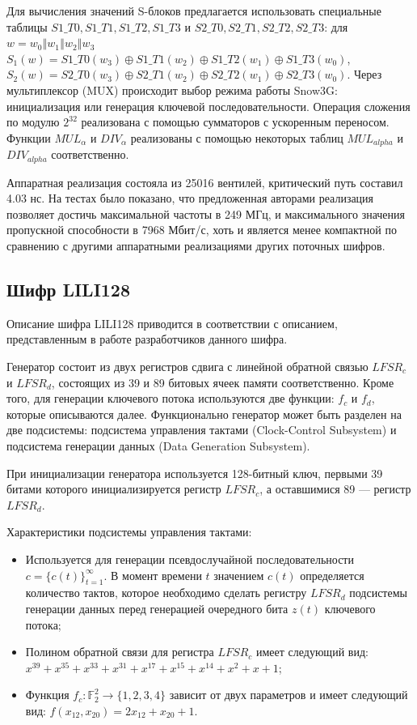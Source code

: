 \documentclass{./civarticle}
\begin{document}
Для вычисления значений S-блоков предлагается использовать специальные таблицы $S1\_T0, S1\_T1, S1\_T2, S1\_T3$ и $S2\_T0, S2\_T1, S2\_T2, S2\_T3$: для $w = w_0 \mathbin\Vert w_1 \mathbin\Vert w_2 \mathbin\Vert w_3$ $S_1(w) = S1\_T0(w_3)\oplus S1\_T1(w_2) \oplus S1\_T2(w_1) \oplus S1\_T3(w_0)$, $S_2(w) = S2\_T0(w_3) \oplus S2\_T1(w_2) \oplus S2\_T2(w_1) \oplus S2\_T3(w_0)$. Через мультиплексор (MUX) происходит выбор режима работы Snow3G: инициализация или генерация ключевой последовательности. Операция сложения по модулю $2^{32}$ реализована с помощью сумматоров с ускоренным переносом. Функции $MUL_\alpha$ и $DIV_\alpha$ реализованы с помощью некоторых таблиц $MUL_{alpha}$ и $DIV_{alpha}$ соответственно. 

Аппаратная реализация состояла из 25016 вентилей, критический путь составил 4.03 нс. На тестах было показано, что предложенная авторами реализация позволяет достичь максимальной частоты в 249 МГц, и максимального значения пропускной способности в 7968 Мбит/с, хоть и является менее компактной по сравнению с другими аппаратными реализациями других поточных шифров.

\subsection{Шифр LILI128}

Описание шифра LILI128 приводится в соответствии с описанием, представленным в работе \cite{lili} разработчиков данного шифра.

Генератор состоит из двух регистров сдвига с линейной обратной связью $LFSR_c$ и $LFSR_d$, состоящих из 39 и 89 битовых ячеек памяти соответственно. Кроме того, для генерации ключевого потока используются две функции: $f_c$ и $f_d$, которые описываются далее. Функционально генератор может быть разделен на две подсистемы: подсистема управления тактами (Clock-Control Subsystem) и подсистема генерации данных (Data Generation Subsystem).

При инициализации генератора используется 128-битный ключ, первыми 39 битами которого инициализируется регистр $LFSR_c$, а оставшимися 89 --- регистр $LFSR_d$.


Характеристики подсистемы управления тактами:
\begin{itemize}
    \item Используется для генерации псевдослучайной последовательности $c = \{c(t)\}_{t = 1}^{\infty}$. В момент времени $t$ значением $c(t)$ определяется количество тактов, которое необходимо сделать регистру $LFSR_d$ подсистемы генерации данных перед генерацией очередного бита $z(t)$ ключевого потока;
    \item Полином обратной связи для регистра $LFSR_c$ имеет следующий вид: $x^{39} + x^{35} + x^{33} + x^{31} + x^{17} + x^{15} + x^{14} + x^2 + x + 1$;
    \item Функция $f_c: \mathbb{F}^2_2 \rightarrow \{ 1, 2, 3, 4 \}$ зависит от двух параметров и имеет следующий вид: $f(x_{12}, x_{20}) = 2x_{12} + x_{20} + 1$.
\end{itemize}
\end{document}
